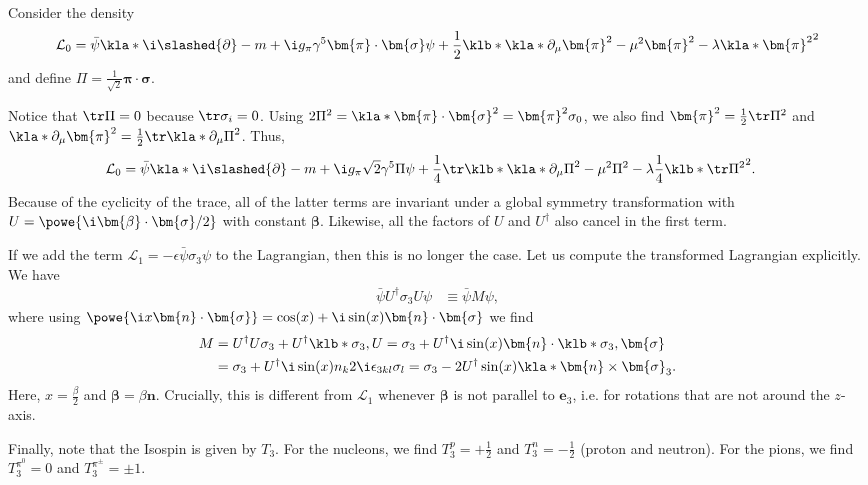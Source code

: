 \documentclass[english, parskip=full]{scrbook}
\newcommand{\example}[3]{\begin{tcolorbox}[colback=colorbackgroundexample,colframe=colorexample, breakable,enhanced,title={\textbf{#1}: #2.}]#3\end{tcolorbox}}
\begin{document}
\example{Lagrangian}{Simple Isospin Model}{
Consider the density
\begin{align}
\mathcal{L}_0=\bar{\psi}\kla*{\i\slashed{\partial}-m + \i g_\pi\gamma^5 \bm{\pi}\cdot\bm{\sigma}}\psi + \frac{1}{2} \klb*{\kla*{\partial_\mu\bm{\pi}}^2 - \mu^2 \bm{\pi}^2} - \lambda\kla*{\bm{\pi}^2}^2
\end{align}
and define $\Pi=\frac{1}{\sqrt{2}}\bm{\pi}\cdot\bm{\sigma}$.

Notice that $\tr\Pi=0$ because $\tr\sigma_i=0$.
Using $2\Pi^2=\kla*{\bm{\pi}\cdot\bm{\sigma}}^2=\bm{\pi}^2\sigma_0$, we also find $\bm{\pi}^2=\frac{1}{2}\tr\Pi^2$ and $\kla*{\partial_\mu\bm{\pi}}^2=\frac{1}{2}\tr\kla*{\partial_\mu\Pi}^2$.
Thus,
\begin{align}
\mathcal{L}_0 &= \bar{\psi}\kla*{\i\slashed{\partial}-m + \i g_\pi \sqrt{2}\gamma^5 \Pi}\psi + \frac{1}{4}\tr \klb*{\kla*{\partial_\mu\Pi}^2 - \mu^2 \Pi^2} - \lambda \frac{1}{4} \klb*{\tr\Pi^2}^2.
\end{align}
Because of the cyclicity of the trace, all of the latter terms are invariant under a global symmetry transformation with $U=\powe{\i\bm{\beta}\cdot\bm{\sigma}/2}$ with constant $\bm{\beta}$.
Likewise, all the factors of $U$ and $U^\dagger$ also cancel in the first term.

If we add the term $\mathcal{L}_1=-\epsilon\bar{\psi}\sigma_3\psi$ to the Lagrangian, then this is no longer the case.
Let us compute the transformed Lagrangian explicitly.
We have
\begin{align}
\bar{\psi}U^\dagger \sigma_3 U\psi &\equiv \bar{\psi} M \psi,
\end{align}
where using $\powe{\i x\bm{n}\cdot\bm{\sigma}} = \cos(x) + \i \sin(x) \bm{n}\cdot\bm{\sigma}$ we find
\begin{align}
M &= U^\dagger U\sigma_3 + U^\dagger \klb*{\sigma_3,U} = \sigma_3 + U^\dagger \i\sin(x) \bm{n}\cdot \klb*{\sigma_3,\bm{\sigma}}\\
&= \sigma_3 + U^\dagger \i \sin(x)n_k 2\i\epsilon_{3kl}\sigma_l = \sigma_3 - 2 U^\dagger \sin(x) \kla*{\bm{n}\times \bm{\sigma}}_3.
\end{align}
Here, $x=\frac{\beta}{2}$ and $\bm{\beta}=\beta\bm{n}$.
Crucially, this is different from $\mathcal{L}_1$ whenever $\bm{\beta}$ is not parallel to $\bm{e}_3$, i.e. for rotations that are not around the $z$-axis.

Finally, note that the Isospin is given by $T_3$.
For the nucleons, we find $T_3^p=+\frac{1}{2}$ and $T_3^n=-\frac{1}{2}$ (proton and neutron).
For the pions, we find $T_3^{\pi^0}=0$ and $T_3^{\pi^\pm}=\pm 1$.
}
\end{document}
